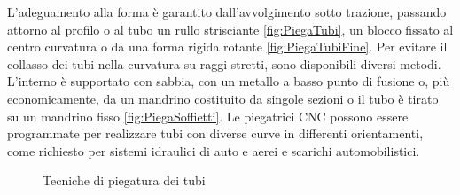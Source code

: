 L'adeguamento alla forma è garantito dall'avvolgimento sotto trazione, passando attorno al profilo o al tubo un rullo strisciante \ref{fig:PiegaTubi}, un blocco fissato al centro curvatura o da una forma rigida rotante \ref{fig:PiegaTubiFine}.
Per evitare il collasso dei tubi nella curvatura su raggi stretti, sono disponibili diversi metodi.
L'interno è supportato con sabbia, con un metallo a basso punto di fusione o, più economicamente, da un mandrino costituito da singole sezioni o il tubo è tirato su un mandrino fisso \ref{fig:PiegaSoffietti}.
Le piegatrici \ac{CNC} possono essere programmate per realizzare tubi con diverse curve in differenti orientamenti, come richiesto per sistemi idraulici di auto e aerei e scarichi automobilistici.

\begin{figure}
\centering
{}\quad
{}\quad
{}
\caption{Tecniche di piegatura dei tubi}
\label{fig:TecPiegaTubi}
\end{figure}

